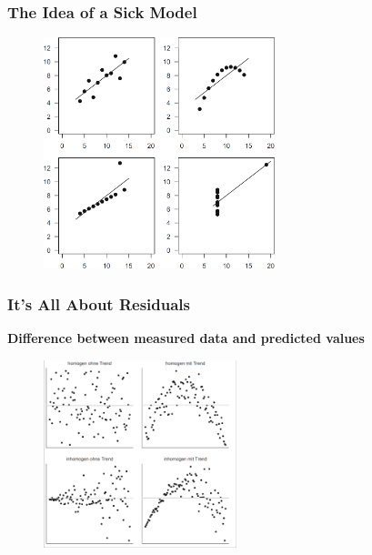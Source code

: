\documentclass{beamer}
\begin{document}
\begin{frame}
    \frametitle{The Idea of a Sick Model}
    \begin{figure}
        \centering
        \includegraphics[width=0.6\textwidth]{lectures/day_2_LM_refresh_I/figures/Anscombe.png}
    \end{figure}
\end{frame}

\begin{frame}
    \frametitle{It's All About Residuals}
    \textbf{Difference between measured data and predicted values}
    
    \begin{figure}[h]
        \centering
        \includegraphics[width=0.5\textwidth]{lectures/day_2_LM_refresh_I/figures/residuals.png} 
    \end{figure}
\end{frame}
\end{document}
